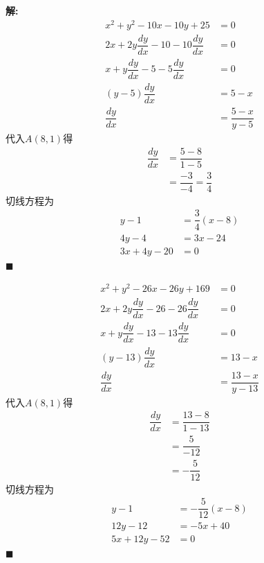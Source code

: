 \documentclass[10pt]{article}
\newcommand{\sol}{\textbf{解:} }
\begin{document}
\begin{enumerate}[leftmargin=*]
\begin{enumerate}
                \sol{}
                \begin{align*}
                  x^{2} + y^{2} - 10x - 10y + 25                  & = 0                    \\
                  2x + 2y \dfrac{dy}{dx} - 10 - 10 \dfrac{dy}{dx} & = 0                    \\
                  x + y \dfrac{dy}{dx} - 5 - 5 \dfrac{dy}{dx}     & = 0                    \\
                  (y - 5) \dfrac{dy}{dx}                          & = 5 - x                \\
                  \dfrac{dy}{dx}                                  & = \dfrac{5 - x}{y - 5}
                \end{align*}
                代入$A(8, 1)$得
                \begin{align*}
                  \dfrac{dy}{dx} & = \dfrac{5 - 8}{1 - 5}          \\
                                 & = \dfrac{-3}{-4} = \dfrac{3}{4}
                \end{align*}
                切线方程为
                \begin{align*}
                  y - 1        & = \dfrac{3}{4}(x - 8) \\
                  4y - 4       & = 3x - 24             \\
                  3x + 4y - 20 & = 0
                \end{align*} \hfill$\blacksquare$

                \begin{align*}
                  x^{2} + y^{2} - 26x - 26y + 169                 & = 0                      \\
                  2x + 2y \dfrac{dy}{dx} - 26 - 26 \dfrac{dy}{dx} & = 0                      \\
                  x + y \dfrac{dy}{dx} - 13 - 13 \dfrac{dy}{dx}   & = 0                      \\
                  (y - 13) \dfrac{dy}{dx}                         & = 13 - x                 \\
                  \dfrac{dy}{dx}                                  & = \dfrac{13 - x}{y - 13}
                \end{align*}
                代入$A(8, 1)$得
                \begin{align*}
                  \dfrac{dy}{dx} & = \dfrac{13 - 8}{1 - 13} \\
                                 & = \dfrac{5}{-12}         \\
                                 & = -\dfrac{5}{12}
                \end{align*}
                切线方程为
                \begin{align*}
                  y - 1         & = -\dfrac{5}{12}(x - 8) \\
                  12y - 12      & = -5x + 40              \\
                  5x + 12y - 52 & = 0
                \end{align*} \hfill$\blacksquare$


\end{enumerate}
\end{enumerate}
\end{document}
